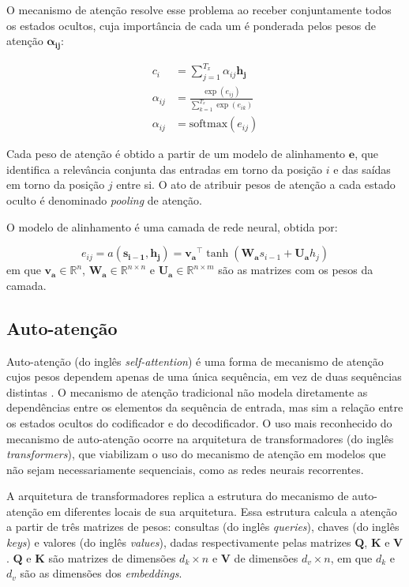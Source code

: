 O mecanismo de atenção \cite{bahdanau2016neural} resolve esse problema ao
receber conjuntamente todos os estados ocultos, cuja importância de cada um é
ponderada pelos pesos de atenção $\mathbf{\alpha_{ij}}$:


\begin{align}
    c_i &= \sum_{j=1}^{T_x} \alpha_{ij} \mathbf{h_j} \\
    \alpha_{ij} &= \frac{\exp(e_{ij})}{\sum_{k=1}^{T_x} \exp(e_{ik})} \\
    \alpha_{ij} &=  \text{softmax}(e_{ij})
\end{align}

Cada peso de atenção é obtido a partir de um modelo de alinhamento $\mathbf{e}$,
que identifica a relevância conjunta das entradas em torno da posição $i$ e das
saídas em torno da posição $j$ entre si. O ato de atribuir pesos de atenção a
cada estado oculto é denominado \textit{pooling} de atenção.

O modelo de alinhamento é uma camada de
rede neural, obtida por:

\begin{equation}
    e_{ij} = a(\mathbf{s_{i-1}}, \mathbf{h_j}) = \mathbf{v_a}^\top \tanh(\mathbf{W_a}s_{i-1} + \mathbf{U_a}h_j)
\end{equation}
em que $\mathbf{v_a} \in \mathbb{R}^n$, $\mathbf{W_a} \in \mathbb{R}^{n \times
n}$ e $\mathbf{U_a} \in \mathbb{R}^{n \times m}$ são as matrizes com os pesos da
camada.

\subsection{Auto-atenção}
Auto-atenção (do inglês \textit{self-attention}) é uma forma de mecanismo de
atenção cujos pesos dependem apenas de uma única sequência, em vez de duas
sequências distintas \cite{kim2017structured}. O mecanismo de atenção
tradicional não modela diretamente as dependências entre os elementos da
sequência de entrada, mas sim a relação entre os estados ocultos do codificador
e do decodificador. O uso mais reconhecido do mecanismo de auto-atenção ocorre
na arquitetura de transformadores (do inglês \textit{transformers}), que
viabilizam o uso do mecanismo de atenção em modelos que não sejam
necessariamente sequenciais, como as redes neurais recorrentes.

A arquitetura de transformadores replica a estrutura do mecanismo de
auto-atenção em diferentes locais de sua arquitetura. Essa estrutura calcula a
atenção a partir de três matrizes de pesos: consultas (do inglês
\textit{queries}), chaves (do inglês \textit{keys}) e valores (do inglês
\textit{values}), dadas respectivamente pelas matrizes $\mathbf{Q}$,
$\mathbf{K}$ e $\mathbf{V}$. $\mathbf{Q}$ e $\mathbf{K}$ são matrizes de dimensões $d_k
\times n$ e $\mathbf{V}$ de dimensões $d_v \times n$, em que $d_k$ e $d_v$
são as dimensões dos \textit{embeddings}.


